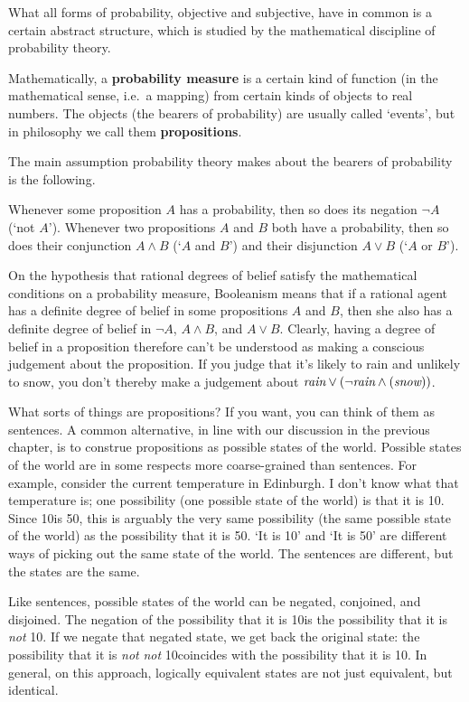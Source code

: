 What all forms of probability, objective and subjective, have in
common is a certain abstract structure, which is studied by the
mathematical discipline of probability theory.

Mathematically, a \textbf{probability measure} is a certain kind of
function (in the mathematical sense, i.e.\ a mapping) from certain
kinds of objects to real numbers. The objects (the bearers of
probability) are usually called `events', but in philosophy we call
them \textbf{propositions}.

The main assumption probability theory makes about the bearers of
probability is the following.
%
\begin{genericthm}[Booleanism]
  Whenever some proposition $A$ has a probability, then so does its
  negation $\neg A$ (`not $A$'). Whenever two propositions $A$ and $B$
  both have a probability, then so does their conjunction $A \land B$
  (`$A$ and $B$') and their disjunction $A \lor B$ (`$A$ or $B$').
\end{genericthm}
%
On the hypothesis that rational degrees of belief satisfy the
mathematical conditions on a probability measure, Booleanism means
that if a rational agent has a definite degree of belief in some
propositions $A$ and $B$, then she also has a definite degree of
belief in $\neg A$, $A \land B$, and $A \lor B$. Clearly, having a
degree of belief in a proposition therefore can't be understood as
making a conscious judgement about the proposition. If you judge that
it's likely to rain and unlikely to snow, you don't thereby make a
judgement about $\emph{rain} \lor (\neg \emph{rain} \land
(\emph{snow}))$. 


What sorts of things are propositions? If you want, you can think of
them as sentences. A common alternative, in line with our discussion
in the previous chapter, is to construe propositions as possible
states of the world. Possible states of the world are in some respects
more coarse-grained than sentences. For example, consider
the current temperature in Edinburgh. I don't know what that
temperature is; one possibility (one possible state of the world) is
that it is 10\celsius. Since 10\celsius is 50\fahrenheit, this is
arguably the very same possibility (the same possible state of the
world) as the possibility that it is 50\fahrenheit. `It is 10\celsius'
and `It is 50\fahrenheit' are different ways of picking out the same
state of the world. The sentences are different, but the states are
the same.

Like sentences, possible states of the world can be negated,
conjoined, and disjoined. The negation of the possibility that it is
10\celsius is the possibility that it is \emph{not} 10\celsius. If we
negate that negated state, we get back the original state: the
possibility that it is \emph{not} \emph{not} 10\celsius coincides with
the possibility that it is 10\celsius. In general, on this approach,
logically equivalent states are not just equivalent, but
identical. 


